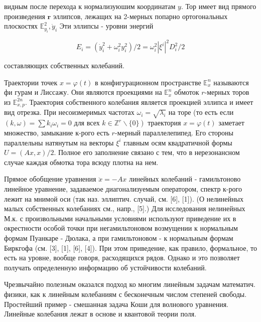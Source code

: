 \documentclass[10pt]{article}
\begin{document}
видным после перехода к нормализуюшим координатам $y$. Тор имеет вид прямого произведения $\boldsymbol{r}$ эллипсов, лежащих на 2-мерных попарно ортогональных плоскостях $\mathbb{E}_{y_{i}}^{2}, \dot{y}_{i}$ Эти эллипсы - уровни энергий



\[

E_{i}=\left(\dot{y}_{i}^{2}+\omega_{i}^{2} y_{i}^{2}\right) / 2=\omega_{i}^{2}\left|\xi^{i}\right|^{2} D_{i}^{2} / 2

\]



составляющих собственных колебаний.



Траектории точек $x=\varphi(t)$ в конфигурационном пространстве $\mathbb{E}_{x}^{n}$ называются фи гурам и Лиссажу. Они являются проекциями на $\mathbb{E}_{x}^{n}$ обмоток $r$-мерных торов из $\mathbb{E}_{x, p}^{2 n}$. Траектория собственного колебания является проекцией эллипса и имеет вид отрезка. При несоизмеримых частотах $\omega_{i}=\sqrt{\lambda_{i}}$ на торе (то есть если $(k, \omega)=\sum k_{i} \omega_{i}=0$ для всех $\left.k \in \mathbb{Z}^{r} \backslash\{0\}\right)$ траектория $x=\varphi(t)$ заметает множество, замыкание к-рого есть $r$-мерный параллелепипед. Его стороны параллельны натянутым на векторы $\xi^{i}$ главным осям квадратичной формы $U=(A x, x) / 2$. Полное его заполнение связано с тем, что в нерезонансном случае каждая обмотка тора всюду плотна на нем.



Прямое обобщение уравнения $\ddot{x}=-A x$ линейных колебаний - гамильтоново линейное уравнение, задаваемое диагонализуемым оператором, спектр к-рого лежит на мнимой оси (так наз. эллиптич. случай, см. [6], [1]). (О нелинейных малых собственных колебаниях см., напр., [5].) Для исследования нелинейных М.к. с произвольными начальными условиями используют приведение их в окрестности особой точки при негамильтоновом возмущении к нормальным формам Пуанкаре - Дюлака, а при гамильтоновом - к нормальным формам Биркгофа (см. [3], [1], [6], [4]). При этом приведение, как правило, формальное, то есть на уровне, вообще говоря, расходящихся рядов. Однако и это позволяет получать определенную информацию об устойчивости колебаний.



Чрезвычайно полезным оказался подход ко многим линейным задачам математич. физики, как к линейным колебаниям с бесконечным числом степеней свободы. Простейший пример - смешанная задача Коши для волнового уравнения. Линейные колебания лежат в основе и квантовой теории поля.
\end{document}
